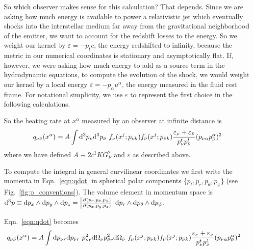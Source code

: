 So which observer makes sense for this calculation? That depends. Since we are
asking how much energy is available to power a relativistic jet which eventually
shocks into the interstellar medium far away from the gravitational
neighborhood of the emitter, we want to account for
the redshift losses to the energy. So we weight our kernel by
$\varepsilon=-p_t c$, the energy redshifted to infinity, because the metric in
our numerical coordinates is stationary and asymptotically flat.
If, however, we were asking how much energy to add as a source term in the
hydrodynamic equations, to compute the evolution of the shock, we would weight
our kernel by a local energy $\varepsilon=-p_\alpha u^\alpha$, the energy
measured in the fluid rest frame. For notational simplicity, we use
$\varepsilon$ to represent the first choice in the following calculations.

So the heating rate at $x^\alpha$ measured by an observer at infinite distance is
\begin{equation}
  \label{eqn:qdot}
  q_{\nu \bar{\nu}}(x^\alpha)
  = A \int \mathrm{d}^3p_{\nu} \mathrm{d}^3p_{\bar{\nu}} \,\,
  f_{\nu}(x^j;p_{\nu k})
  f_{\bar{\nu}}(x^j;p_{\bar{\nu} k})
  \frac{  \varepsilon_{\nu}+\varepsilon_{\bar{\nu}}}{p_{\nu}^t p_{\bar{\nu}}^t}
  (p_{\nu \alpha} p_{\bar{\nu}}^\alpha)^2
\end{equation}
where we have defined $A \equiv 2 c^3 K G_F^2$ and $\varepsilon$ as described above.

To compute the integral in general curvilinear coordinates we first write the
momenta in Eqn.~\ref{eqn:qdot} in spherical polar components
$\{p_t,p_r,p_{\theta},p_{\phi}\}$ (see Fig.~\ref{fig:p_conventions}).
The volume element in momentum space is
$\mathrm{d}^3p\equiv\mathrm{d} p_x\wedge\mathrm{d} p_y\wedge\mathrm{d} p_z=\left|\frac{\partial(p_r,p_\theta,p_\phi)}{\partial(p_x,p_y,p_z)}\right|\mathrm{d} p_r\wedge\mathrm{d} p_{\theta}\wedge\mathrm{d} p_{\phi}$.

Eqn.~\ref{eqn:qdot} becomes
\begin{align}
  \label{eqn:qdot_general_orig}
  q_{\nu \bar{\nu}}(x^\alpha)
  &= A \int \mathrm{d} p_{\nu r} \mathrm{d} p_{\bar{\nu} r} \,\,
  p_{\nu r}^2 \mathrm{d}\Omega_{\nu} p_{\bar{\nu} r}^2 \mathrm{d}\Omega_{\bar{\nu}} \,\,
  f_{\nu}(x^j;p_{\nu k}) f_{\bar{\nu}}(x^j;p_{\bar{\nu} k})
  \frac{\varepsilon_{\nu} + \varepsilon_{\bar{\nu}}}{p_{\nu}^t p_{\bar{\nu}}^t}
  (p_{\nu \alpha} p_{\bar{\nu}}^\alpha)^2
\end{align}

